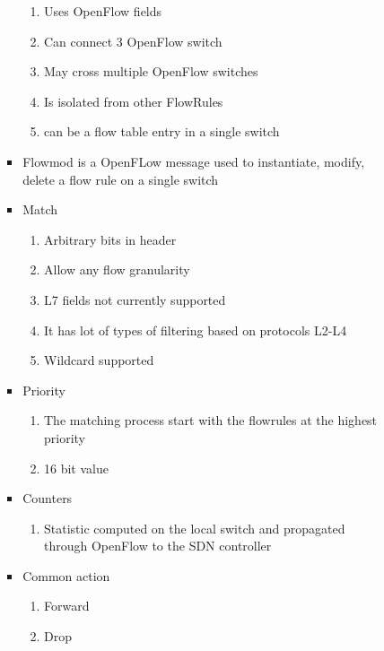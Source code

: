 \documentclass{article}
\begin{document}
\begin{itemize}
\begin{itemize}
\begin{itemize}
\begin{itemize}
                \begin{enumerate}
                    \item Uses OpenFlow fields
                    \item Can connect 3 OpenFlow switch
                    \item May cross multiple OpenFlow switches
                    \item Is isolated from other FlowRules
                    \item can be a flow table entry in a single switch
                \end{enumerate}
                \item Flowmod is a OpenFLow message used to instantiate, modify, delete a flow rule on a single switch
                \item Match
                \begin{enumerate}
                    \item Arbitrary bits in header
                    \item Allow any flow granularity
                    \item L7 fields not currently supported
                    \item It has lot of types of filtering based on protocols L2-L4
                    \item Wildcard supported
                \end{enumerate}
                \item Priority
                \begin{enumerate}
                    \item The matching process start with the flowrules at the highest priority
                    \item 16 bit value
                \end{enumerate}
                \item Counters
                \begin{enumerate}
                    \item Statistic computed on the local switch and propagated through OpenFlow to the SDN controller
                \end{enumerate}
                \item Common action
                \begin{enumerate}
                    \item Forward
                    \item Drop

\end{enumerate}
\end{itemize}
\end{itemize}
\end{itemize}
\end{itemize}
\end{document}
